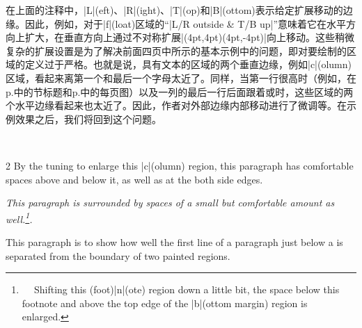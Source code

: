在上面的注释中，|L|(eft)、|R|(ight)、|T|(op)和|B|(ottom)表示给定扩展移动的边缘。因此，例如，对于|f|(loat)区域的``|L/R outside & T/B up|''意味着它在水平方向上扩大，在垂直方向上通过不对称扩展|(4pt,4pt)(4pt,-4pt)|向上移动。这些稍微复杂的扩展设置是为了解决前面四页中所示的基本示例中的问题，即对要绘制的区域的定义过于严格。也就是说，具有文本的区域的两个垂直边缘，例如|c|(olumn)区域，看起来离第一个和最后一个字母太近了。同样，当第一行很高时（例如，在p.\Tie\pageref{sec:bgpaint}中的节标题和p.\Tie\pageref{page:bgpaint2}中的每页图）以及一列的最后一行后面跟着\mctext{}或\postenv 时，这些区域的两个水平边缘看起来也太近了。因此，作者对外部边缘内部移动进行了微调等。在示例效果之后，我们将回到这个问题。
\par\bigskip

\advance\skip{}\relax
\begin{paracol}{2}
By the tuning to enlarge this |c|(olumn) region, this paragraph has
comfortable spaces above and below it, as well as at the both side edges.

\switchcolumn
\begingroup\it
This paragraph is surrounded by spaces of a small but comfortable amount as
well.\footnote{

Shifting this (foot)|n|(ote) region down a little bit, the space below this
footnote and above the top edge of the |b|(ottom margin) region is enlarged.}.

\par\endgroup
{}


This paragraph is to show how well the first line of a paragraph just below a
\mctext{} is separated from the boundary of two painted regions.
\par\vfill


\end{paracol}
